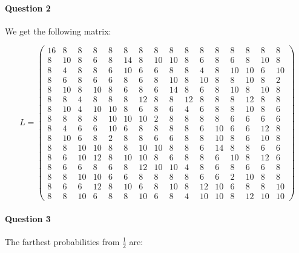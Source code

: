 \documentclass[a4paper]{article}
\author{Paul Fermé \and Léo Exibard}
\begin{document}
\paragraph{Question 2}

We get the following matrix:

\begin{equation*}
L = \left(
\begin{array}{cccccccccccccccc}
16 & 8 & 8 & 8 & 8 & 8 & 8 & 8 & 8 & 8 & 8 & 8 & 8 & 8 & 8 & 8 \\
8 & 10 & 8 & 6 & 8 & 14 & 8 & 10 & 10 & 8 & 6 & 8 & 6 & 8 & 10 & 8 \\
8 & 4 & 8 & 8 & 6 & 10 & 6 & 6 & 8 & 8 & 4 & 8 & 10 & 10 & 6 & 10 \\
8 & 6 & 8 & 6 & 6 & 8 & 6 & 8 & 10 & 8 & 10 & 8 & 8 & 10 & 8 & 2 \\
8 & 10 & 8 & 10 & 8 & 6 & 8 & 6 & 14 & 8 & 6 & 8 & 10 & 8 & 10 & 8 \\
8 & 8 & 4 & 8 & 8 & 8 & 12 & 8 & 8 & 12 & 8 & 8 & 8 & 12 & 8 & 8 \\
8 & 10 & 4 & 10 & 10 & 8 & 6 & 8 & 6 & 4 & 6 & 8 & 8 & 10 & 8 & 6 \\
8 & 8 & 8 & 8 & 10 & 10 & 10 & 2 & 8 & 8 & 8 & 8 & 6 & 6 & 6 & 6 \\
8 & 4 & 6 & 6 & 10 & 6 & 8 & 8 & 8 & 8 & 6 & 10 & 6 & 6 & 12 & 8 \\
8 & 10 & 6 & 8 & 2 & 8 & 8 & 6 & 6 & 8 & 8 & 10 & 8 & 6 & 10 & 8 \\
8 & 8 & 10 & 10 & 8 & 8 & 10 & 10 & 8 & 8 & 6 & 14 & 8 & 8 & 6 & 6 \\
8 & 6 & 10 & 12 & 8 & 10 & 10 & 8 & 6 & 8 & 8 & 6 & 10 & 8 & 12 & 6 \\
8 & 6 & 6 & 8 & 6 & 8 & 12 & 10 & 10 & 4 & 8 & 6 & 8 & 6 & 6 & 8 \\
8 & 8 & 10 & 10 & 6 & 6 & 8 & 8 & 8 & 8 & 6 & 6 & 2 & 10 & 8 & 8 \\
8 & 6 & 6 & 12 & 8 & 10 & 6 & 8 & 10 & 8 & 12 & 10 & 6 & 8 & 8 & 10 \\
8 & 8 & 10 & 6 & 8 & 8 & 10 & 6 & 8 & 4 & 10 & 10 & 8 & 12 & 10 & 10
\end{array}
\right)
\end{equation*}

\paragraph{Question 3}

The farthest probabilities from $\frac{1}{2}$ are:
\end{document}
